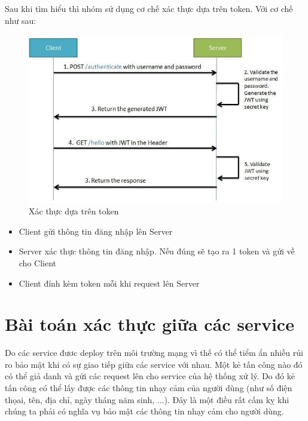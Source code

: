 		Sau khi tìm hiểu thì nhóm sử dụng cơ chế xác thực dựa trên token. Với cơ chế như sau:
		
		\begin{figure}[H]
			\includegraphics[width=1\textwidth]{Images/authbasedtoken.jpg}
			\centering
			\linebreak
			\caption{Xác thực dựa trên token\cite{jwtpic}}
		\end{figure}
		
		\begin{itemize}
                \item Client gửi thông tin đăng nhập lên Server
                \item Server xác thực thông tin đăng nhập. Nếu đúng sẽ tạo ra 1 token và gửi về cho Client
                \item Client đính kèm token mỗi khi request lên Server 
            \end{itemize}
		
		
		\section{Bài toán xác thực giữa các service}
		Do các service đươc deploy trên môi trường mạng vì thế có thể tiểm ẩn nhiều rủi ro bảo mật khi có sự giao tiếp giữa các service với nhau. Một kẻ tấn công nào đó có thể giả danh và gửi các request lên cho service của hệ thống xử lý. Do đó kẻ tấn công có thể lấy được các thông tin nhạy cảm của người dùng (như số điện thọai, tên, địa chỉ, ngày tháng năm sinh, ...). Đây là một điều rất cấm kỵ khi chúng ta phải có nghĩa vụ bảo mật các thông tin nhạy cảm cho người dùng.\\
		

